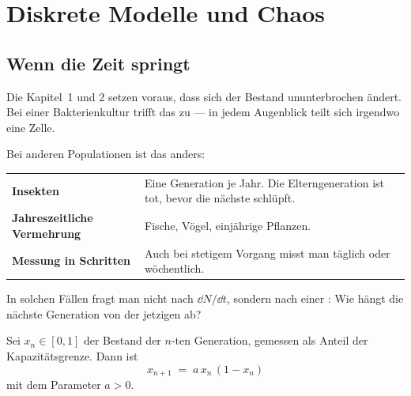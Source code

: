 \chapter{Diskrete Modelle und Chaos}

\section{Wenn die Zeit springt}

\begin{merksatz}
Die Kapitel~1 und 2 setzen voraus, dass sich der Bestand ununterbrochen ändert. Bei einer Bakterienkultur trifft das zu --- in jedem Augenblick teilt sich irgendwo eine Zelle.

Bei anderen Populationen ist das anders:

\begin{center}
{\small
\renewcommand{\arraystretch}{1.5}
\begin{tabular}{@{}P{2.6cm}P{6.0cm}@{}}
\toprule
\textbf{Insekten} & Eine Generation je Jahr. Die Elterngeneration ist tot, bevor die nächste schlüpft.\\
\textbf{Jahreszeitliche Vermehrung} & Fische, Vögel, einjährige Pflanzen.\\
\textbf{Messung in Schritten} & Auch bei stetigem Vorgang misst man täglich oder wöchentlich.\\
\bottomrule
\end{tabular}}
\end{center}

\begin{center}
\begin{minipage}{0.9\textwidth}
In solchen Fällen fragt man nicht nach $\dd N/\dd t$, sondern nach einer : Wie hängt die nächste Generation von der jetzigen ab?
\end{minipage}
\end{center}
\end{merksatz}

\begin{definition}
Sei $x_n \in [0,1]$ der Bestand der $n$-ten Generation, gemessen als Anteil der Kapazitätsgrenze. Dann ist
\[ x_{n+1} \;=\; a\,x_n\,(1-x_n) \]
mit dem Parameter $a > 0$.
\end{definition}

